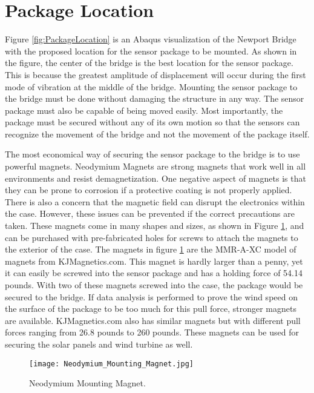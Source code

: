 \section{Package Location}

\indent Figure \ref{fig:PackageLocation} is an Abaqus visualization of the Newport Bridge with the proposed location for the sensor package to be mounted.
As shown in the figure, the center of the bridge is the best location for the sensor package. This is because the greatest amplitude of displacement will
occur during the first mode of vibration at the middle of the bridge. Mounting the sensor package to the bridge must be done without damaging the
structure in any way. The sensor package must also be capable of being moved easily. Most importantly, the package must be secured without any of its
own motion so that the sensors can recognize the movement of the bridge and not the movement of the package itself. 

The most economical way of securing the sensor package to the bridge is to use powerful magnets. Neodymium Magnets are strong magnets that work well in
all environments and resist demagnetization. One negative aspect of magnets is that they can be prone to corrosion if a protective coating is not
properly applied. There is also a concern that the magnetic field can disrupt the electronics within the case. However, these issues can be prevented if
the correct precautions are taken. These magnets come in many shapes and sizes, as shown in Figure \ref{fig:Mounting Magnet}, and can be purchased with
pre-fabricated holes for screws to attach the magnets to the exterior of the case. The magnets in figure \ref{fig:Mounting Magnet} are the MMR-A-XC
model of magnets from KJMagnetics.com. This magnet is hardly larger than a penny, yet it can easily be screwed into the sensor package and has a
holding force of 54.14 pounds. With two of these magnets screwed into the case, the package would be secured to the bridge. If data analysis is
performed to prove the wind speed on the surface of the package to be too much for this pull force, stronger magnets are available. KJMagnetics.com
also has similar magnets but with different pull forces ranging from 26.8 pounds to 260 pounds. These magnets can be used for securing the solar
panels and wind turbine as well. 

\begin{figure}[ht]
\centering
\texttt{[image: Neodymium\_Mounting\_Magnet.jpg]}
\caption{Neodymium Mounting Magnet.}
\label{fig:Mounting Magnet}
\end{figure}

